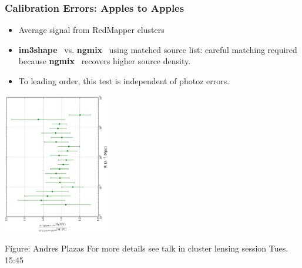 \documentclass{beamer}
\newcommand{\ngmix}{ {\bf ngmix} }
\newcommand{\imshape}{ {\bf im3shape} }
\begin{document}
\frame
{
    \frametitle{Calibration Errors: Apples to Apples}

    \fontsize{8}{0.8\baselineskip}
    \begin{itemize}

        \item Average signal from RedMapper clusters

        \item \imshape\ vs. \ngmix\ using matched source list: careful matching
            required because \ngmix\ recovers higher source density.

        \item To leading order, this test is independent of photoz errors.

    \end{itemize}

    \begin{center}
        \includegraphics[width=0.35\textwidth,angle=-90]{dsig_ratio_crop.pdf}
    \end{center}
    {\tiny Figure: Andres Plazas
        For more details see talk in cluster lensing
            session Tues. 15:45
        }
}
\end{document}
